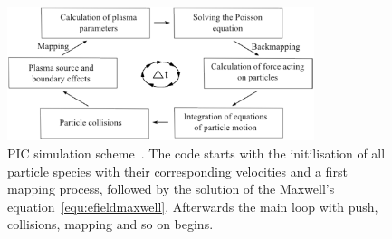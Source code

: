 %
			\begin{figure}[!t]
				\centering
				\includegraphics[width=0.8\textwidth]{figures/picscheme.pdf}
				\caption{%
				PIC simulation scheme~\cite{Matthias15}. The code starts with the initilisation of all particle species with their corresponding velocities and a first mapping process, followed by the solution of the Maxwell's equation~\autoref{equ:efieldmaxwell}. Afterwards the main loop with push, collisions, mapping and so on begins.}\label{fig:picscheme}
			\end{figure}
